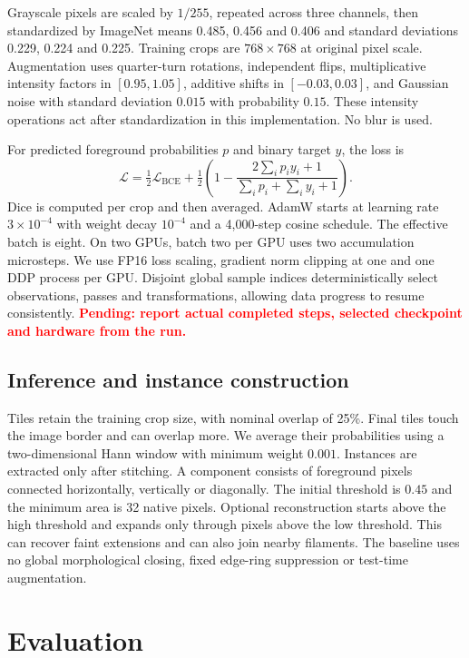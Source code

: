 \documentclass[sigconf]{acmart}
\newcommand{\pending}[1]{\textcolor{red}{\textbf{Pending: #1}}}
\begin{document}
Grayscale pixels are scaled by $1/255$, repeated across three channels, then standardized by ImageNet means 0.485, 0.456 and 0.406 and standard deviations 0.229, 0.224 and 0.225. Training crops are $768\times768$ at original pixel scale. Augmentation uses quarter-turn rotations, independent flips, multiplicative intensity factors in $[0.95,1.05]$, additive shifts in $[-0.03,0.03]$, and Gaussian noise with standard deviation $0.015$ with probability $0.15$. These intensity operations act after standardization in this implementation. No blur is used.

For predicted foreground probabilities $p$ and binary target $y$, the loss is
\begin{equation}
\mathcal{L}=\tfrac12\mathcal{L}_{\mathrm{BCE}}+\tfrac12\left(1-\frac{2\sum_i p_i y_i+1}{\sum_i p_i+\sum_i y_i+1}\right).
\end{equation}
Dice is computed per crop and then averaged. AdamW starts at learning rate $3\times10^{-4}$ with weight decay $10^{-4}$ and a 4,000-step cosine schedule. The effective batch is eight. On two GPUs, batch two per GPU uses two accumulation microsteps. We use FP16 loss scaling, gradient norm clipping at one and one DDP process per GPU. Disjoint global sample indices deterministically select observations, passes and transformations, allowing data progress to resume consistently. \pending{report actual completed steps, selected checkpoint and hardware from the run.}

\subsection{Inference and instance construction}
Tiles retain the training crop size, with nominal overlap of 25\%. Final tiles touch the image border and can overlap more. We average their probabilities using a two-dimensional Hann window with minimum weight $0.001$. Instances are extracted only after stitching. A component consists of foreground pixels connected horizontally, vertically or diagonally. The initial threshold is $0.45$ and the minimum area is 32 native pixels. Optional reconstruction starts above the high threshold and expands only through pixels above the low threshold. This can recover faint extensions and can also join nearby filaments. The baseline uses no global morphological closing, fixed edge-ring suppression or test-time augmentation.

\section{Evaluation}\label{sec:evaluation}
\end{document}
